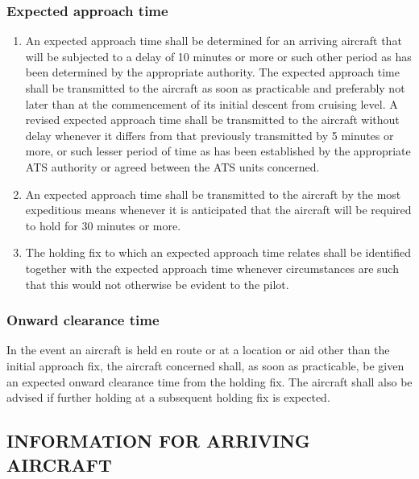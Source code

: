 \subsubsection{Expected approach time}

\begin{enumerate}
    \item An expected approach time shall be determined for an arriving aircraft that will be subjected to a delay of 10 minutes or more or such other period as has been determined by the appropriate authority. The expected approach time shall be transmitted to the aircraft as soon as practicable and preferably not later than at the commencement of its initial descent from cruising level. A revised expected approach time shall be transmitted to the aircraft without delay whenever it differs from that previously transmitted by 5 minutes or more, or such lesser period of time as has been established by the appropriate ATS authority or agreed between the ATS units concerned.
    \item An expected approach time shall be transmitted to the aircraft by the most expeditious means whenever it is anticipated that the aircraft will be required to hold for 30 minutes or more.
    \item The holding fix to which an expected approach time relates shall be identified together with the expected approach time whenever circumstances are such that this would not otherwise be evident to the pilot.
\end{enumerate}

\subsubsection{Onward clearance time} \label{6.5.8}

In the event an aircraft is held en route or at a location or aid other than the initial approach fix, the aircraft concerned shall, as soon as practicable, be given an expected onward clearance time from the holding fix. The aircraft shall also be advised if further holding at a subsequent holding fix is expected.

\subsection[Information for arriving aircraft]{INFORMATION FOR ARRIVING AIRCRAFT}

